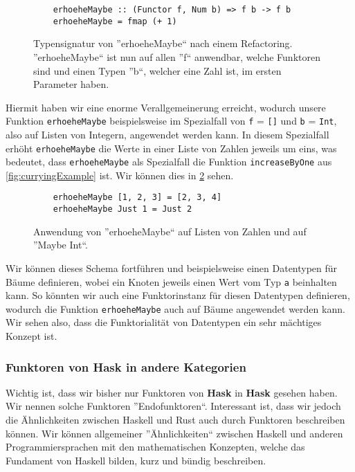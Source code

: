 \documentclass{hhuarticle}
\theoremstyle{definition}
\theoremstyle{theorem}
\begin{document}
  \begin{figure}[h]
    \begin{verbatim}
    erhoeheMaybe :: (Functor f, Num b) => f b -> f b
    erhoeheMaybe = fmap (+ 1)
    \end{verbatim}
    \caption{Typensignatur von ''erhoeheMaybe`` nach einem Refactoring. ''erhoeheMaybe`` ist nun auf allen ''f`` anwendbar, welche Funktoren sind und einen Typen ''b``, welcher eine Zahl ist, im ersten Parameter haben. }%
    \label{fig:maybeTypeAnwenden3}
  \end{figure}

  Hiermit haben wir eine enorme Verallgemeinerung erreicht, wodurch unsere
  Funktion \verb|erhoeheMaybe| beispielsweise im Spezialfall von \verb|f| = \verb|[]|
  und \verb|b| = \verb|Int|, also auf Listen von Integern, angewendet werden kann.
  In diesem Spezialfall erhöht \verb|erhoeheMaybe| die Werte in einer Liste von Zahlen
  jeweils um eins, was bedeutet, dass \verb|erhoeheMaybe| als Spezialfall
  die Funktion \verb|increaseByOne| aus \cref{fig:curryingExample} ist.
  Wir können dies in \cref{fig:maybeTypeAnwenden4} sehen.

  \begin{figure}[h]
    \begin{verbatim}
    erhoeheMaybe [1, 2, 3] = [2, 3, 4]
    erhoeheMaybe Just 1 = Just 2
    \end{verbatim}
    \caption{Anwendung von ''erhoeheMaybe`` auf Listen von Zahlen und auf ''Maybe Int``.}%
    \label{fig:maybeTypeAnwenden4}
  \end{figure}

  Wir können dieses Schema fortführen und beispielsweise einen Datentypen
  für Bäume definieren, wobei ein Knoten jeweils einen Wert vom Typ \verb|a|
  beinhalten kann. So könnten wir auch eine Funktorinstanz für diesen
  Datentypen definieren, wodurch die Funktion \verb|erhoeheMaybe| auch auf
  Bäume angewendet werden kann. Wir sehen also, dass die Funktorialität
  von Datentypen ein sehr mächtiges Konzept ist.

  \subsubsection{Funktoren von \textbf{Hask} in andere Kategorien}

  Wichtig ist, dass wir bisher nur Funktoren von \textbf{Hask} in \textbf{Hask}
  gesehen haben. Wir nennen solche Funktoren ''Endofunktoren``.
  Interessant ist, dass wir jedoch die Ähnlichkeiten zwischen Haskell
  und Rust auch durch Funktoren beschreiben können. Wir können allgemeiner
  ''Ähnlichkeiten`` zwischen Haskell und anderen Programmiersprachen
  mit den mathematischen Konzepten, welche das Fundament von Haskell
  bilden, kurz und bündig beschreiben.
\end{document}
